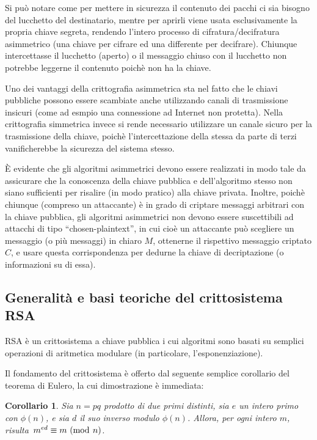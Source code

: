 \documentclass[pdflatex,11pt,a4paper,oneside]{article}
\newcommand{\p}[1]{\left({#1}\right)}
\newcommand{\ephi}[1]{\ensuremath{\phi\p{#1}}}
\newcommand{\congruent}[0]{\equiv}
\newcommand{\mmodop}[0]{\ensuremath{\operatorname{mod}}}
\newcommand{\mmod}[1]{\ensuremath{\allowbreak\ (\mmodop\:{#1})}}
\newtheorem{corollary}[TheoremLike]{Corollario}
\begin{document}
Si pu\`o notare come per mettere in sicurezza il contenuto dei pacchi
ci sia bisogno del lucchetto del destinatario, mentre per aprirli viene
usata esclusivamente la propria chiave segreta, rendendo l'intero processo
di cifratura/decifratura asimmetrico (una chiave per cifrare ed una
differente per decifrare). Chiunque intercettasse il lucchetto (aperto)
o il messaggio chiuso con il lucchetto non potrebbe leggerne il contenuto
poich\`e non ha la chiave.

\medskip
Uno dei vantaggi della crittografia asimmetrica sta nel fatto che le
chiavi pubbliche possono essere scambiate anche utilizzando canali di
trasmissione insicuri (come ad esmpio una connessione ad Internet non
protetta). Nella crittografia simmetrica invece si rende necessario
utilizzare un canale sicuro per la trasmissione della chiave, poich\`e
l'intercettazione della stessa da parte di terzi vanificherebbe la
sicurezza del sistema stesso.

\medskip
\`E evidente che gli algoritmi asimmetrici devono essere realizzati in
modo tale da assicurare che la conoscenza della chiave pubblica e
dell'algoritmo stesso non siano sufficienti per risalire (in modo
pratico) alla chiave privata. Inoltre, poich\`e chiunque (compreso
un attaccante) \`e in grado di criptare messaggi arbitrari con la
chiave pubblica, gli algoritmi asimmetrici non devono essere
suscettibili ad attacchi di tipo ``chosen-plaintext'', in cui cio\`e
un attaccante pu\`o scegliere un messaggio (o pi\`u messaggi) in
chiaro $M$, ottenerne il rispettivo messaggio criptato $C$, e usare
questa corrispondenza per dedurne la chiave di decriptazione (o
informazioni su di essa).

\subsection{Generalit\`a e basi teoriche del crittosistema RSA}%
           \label{sect:rsa-basic}

RSA \`e un crittosistema a chiave pubblica i cui algoritmi sono basati
su semplici operazioni di aritmetica modulare (in particolare,
l'esponenziazione).

\smallskip
Il fondamento del crittosistema \`e offerto dal seguente semplice
corollario del teorema di Eulero, la cui dimostrazione \`e immediata:

\begin{corollary}\label{cor:euler-for-rsa}
Sia $n = pq$ prodotto di due primi distinti, sia $e$ un intero primo con
$\ephi{n}$, e sia $d$ il suo inverso modulo $\ephi{n}$. Allora, per ogni
intero $m$, risulta\, $m^{ed} \congruent m \mmod n$.
\end{corollary}
\end{document}
